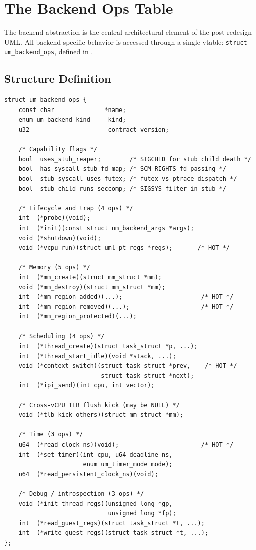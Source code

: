 \section{The Backend Ops Table}
\label{sec:impl-backend-ops}

The backend abstraction is the central architectural element of the
post-redesign UML.  All backend-specific behavior is accessed through a single
vtable: \texttt{struct um\_backend\_ops}, defined in
.

\subsection{Structure Definition}

\begin{lstlisting}[language=KernelC,caption={The \texttt{um\_backend\_ops} structure (annotated excerpt)},label=lst:backend-ops-impl]
struct um_backend_ops {
    const char              *name;
    enum um_backend_kind     kind;
    u32                      contract_version;

    /* Capability flags */
    bool  uses_stub_reaper;        /* SIGCHLD for stub child death */
    bool  has_syscall_stub_fd_map; /* SCM_RIGHTS fd-passing */
    bool  stub_syscall_uses_futex; /* futex vs ptrace dispatch */
    bool  stub_child_runs_seccomp; /* SIGSYS filter in stub */

    /* Lifecycle and trap (4 ops) */
    int  (*probe)(void);
    int  (*init)(const struct um_backend_args *args);
    void (*shutdown)(void);
    void (*vcpu_run)(struct uml_pt_regs *regs);       /* HOT */

    /* Memory (5 ops) */
    int  (*mm_create)(struct mm_struct *mm);
    void (*mm_destroy)(struct mm_struct *mm);
    int  (*mm_region_added)(...);                      /* HOT */
    int  (*mm_region_removed)(...);                    /* HOT */
    int  (*mm_region_protected)(...);

    /* Scheduling (4 ops) */
    int  (*thread_create)(struct task_struct *p, ...);
    int  (*thread_start_idle)(void *stack, ...);
    void (*context_switch)(struct task_struct *prev,    /* HOT */
                           struct task_struct *next);
    int  (*ipi_send)(int cpu, int vector);

    /* Cross-vCPU TLB flush kick (may be NULL) */
    void (*tlb_kick_others)(struct mm_struct *mm);

    /* Time (3 ops) */
    u64  (*read_clock_ns)(void);                       /* HOT */
    int  (*set_timer)(int cpu, u64 deadline_ns,
                      enum um_timer_mode mode);
    u64  (*read_persistent_clock_ns)(void);

    /* Debug / introspection (3 ops) */
    void (*init_thread_regs)(unsigned long *gp,
                             unsigned long *fp);
    int  (*read_guest_regs)(struct task_struct *t, ...);
    int  (*write_guest_regs)(struct task_struct *t, ...);
};
\end{lstlisting}

